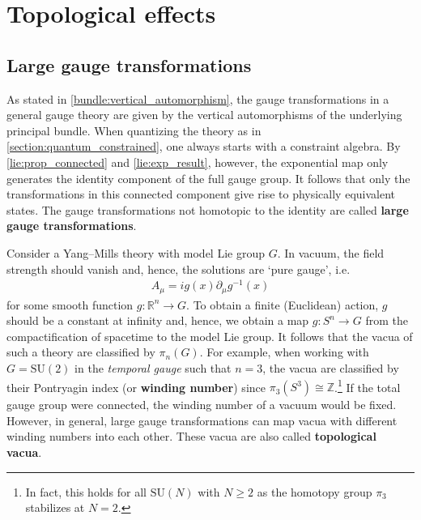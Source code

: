 
\section{Topological effects}
\subsection{Large gauge transformations}

    As stated in \cref{bundle:vertical_automorphism}, the gauge transformations in a general gauge theory are given by the vertical automorphisms of the underlying principal bundle. When quantizing the theory as in \cref{section:quantum_constrained}, one always starts with a constraint algebra. By \cref{lie:prop_connected} and \cref{lie:exp_result}, however, the exponential map only generates the identity component of the full gauge group. It follows that only the transformations in this connected component give rise to physically equivalent states. The gauge transformations not homotopic to the identity are called \textbf{large gauge transformations}. 

    Consider a Yang--Mills theory with model Lie group $G$. In vacuum, the field strength should vanish and, hence, the solutions are `pure gauge', i.e.
    \begin{gather}
        A_\mu = ig(x)\partial_\mu g^{-1}(x)
    \end{gather}
    for some smooth function $g:\mathbb{R}^n\rightarrow G$. To obtain a finite (Euclidean) action, $g$ should be a constant at infinity and, hence, we obtain a map $g:S^n\rightarrow G$ from the compactification of spacetime to the model Lie group. It follows that the vacua of such a theory are classified by $\pi_n(G)$. For example, when working with $G=\mathrm{SU}(2)$ in the \textit{temporal gauge} such that $n=3$, the vacua are classified by their Pontryagin index (or \textbf{winding number}) since $\pi_3(S^3)\cong\mathbb{Z}$.\footnote{In fact, this holds for all $\mathrm{SU}(N)$ with $N\geq2$ as the homotopy group $\pi_3$ stabilizes at $N=2$.} If the total gauge group were connected, the winding number of a vacuum would be fixed. However, in general, large gauge transformations can map vacua with different winding numbers into each other. These vacua are also called \textbf{topological vacua}.


